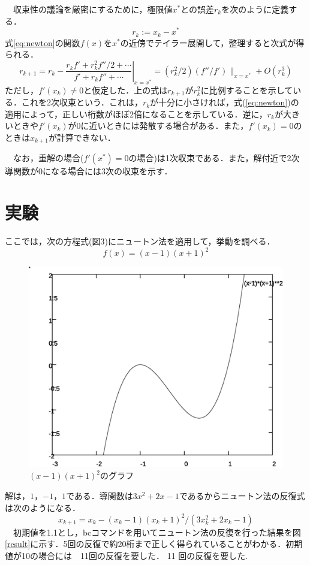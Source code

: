 \documentclass[a4j,11pt]{jarticle}
\begin{document}
　収束性の議論を厳密にするために，極限値$x^*$との誤差$r_k$を次のように定義する．
\begin{equation}
r_k:=x_k-x^*
\label{eq:syuusoku}
\end{equation}
式\ref{eq:newton}の関数$f(x)$を$x^*$の近傍でテイラー展開して，整理すると次式が得られる\cite{author1}．
\begin{equation}
r_{k+1}=r_k-\left. \frac{r_kf'+r^2_kf''/2+\cdots}{f'+r_kf''+\cdots} \right|_{x=x^*}
=(r^2_k/2)(f''/f')\|_{x=x^*}+O(r^3_k)
\label{eq:taylor}
\end{equation}
ただし，$f'(x_k)\neq 0$と仮定した．上の式は$r_{k+1}$が$r^2_k$に比例することを示している．これを2次収束という．これは，$r_k$が十分に小さければ，式(\ref{eq:newton})の適用によって，正しい桁数がほぼ2倍になることを示している．逆に，$r_k$が大きいときや$f'(x_k)$が0に近いときには発散する場合がある．また，$f'(x_k)=0$のときは$x_{k+1}$が計算できない．

　なお，重解の場合($f'(x^*)=0$の場合)は1次収束である．また，解付近で2次導関数が0になる場合には3次の収束を示す．

\section{実験}
ここでは，次の方程式(図3)にニュートン法を適用して，挙動を調べる．
\begin{equation}
f(x)=(x-1)(x+1)^2
\label{eq:fx}
\end{equation}
\begin{figure}
\includegraphics[scale=0.6]{newton.eps}
\caption{$(x-1)(x+1)^2のグラフ$}
\label{1}
\end{figure}
解は，$1$，$-1$，$1$である．導関数は$3x^2+2x-1$であるからニュートン法の反復式は次のようになる．
\begin{equation}
x_{k+1}=x_k-(x_k-1)(x_k+1)^2/(3x^2_k+2x_k-1)
\label{newtonrepeat}
\end{equation}
　初期値を1.1とし，bcコマンドを用いてニュートン法の反復を行った結果を図\ref{result}に示す．5回の反復で約20桁まで正しく得られていることがわかる．初期値が10の場合には　11回の反復を要した．
11 回の反復を要した.
\end{document}
